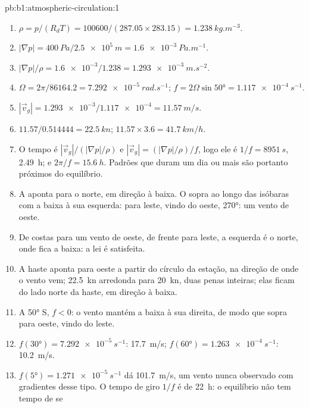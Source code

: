 \begin{solution}{pb:b1:atmospheric-circulation:1}
\begin{enumerate}
  \item $\rho = p/(R_dT) = \num{100600}/(287.05 \times 283.15) =
        \qty{1.238}{kg.m^{-3}}$.
  \item $|\nabla p| = \qty{400}{Pa}/\qty{2.5e5}{m} = \qty{1.6e-3}{Pa.m^{-1}}$.
  \item $|\nabla p|/\rho = \num{1.6e-3}/1.238 = \qty{1.293e-3}{m.s^{-2}}$.
  \item $\Omega = 2\pi/\num{86164.2} = \qty{7.292e-5}{rad.s^{-1}}$;
        $f = 2\Omega\sin\ang{50} = \qty{1.117e-4}{s^{-1}}$.
  \item $|\vec v_g| = \num{1.293e-3}/\num{1.117e-4} = \qty{11.57}{m/s}$.
  \item $11.57/0.514444 = \qty{22.5}{kn}$; $11.57 \times 3.6 = \qty{41.7}{km/h}$.
  \item O tempo é $|\vec v_g|/(|\nabla p|/\rho)$ e $|\vec v_g| = (|\nabla
        p|/\rho)/f$, logo ele é $1/f = \qty{8951}{s}$, \qty{2.49}{h}; e $2\pi/f =
        \qty{15.6}{h}$. Padrões que duram um dia ou mais são portanto próximos do equilíbrio.
  \item A  aponta para o norte, em direção à baixa. O 
        sopra ao longo das isóbaras com a baixa à sua esquerda: para leste, vindo do oeste, 
        \ang{270}: um vento de oeste.
  \item De costas para um vento de oeste, de frente para leste, a esquerda é o norte, onde fica a
        baixa: a lei é satisfeita.
  \item A haste aponta para oeste a partir do círculo da estação, na direção de onde o vento vem;
        \qty{22.5}{kn} arredonda para \qty{20}{kn}, duas penas inteiras; elas ficam do lado norte da
        haste, em direção à baixa.
  \item A \ang{50} S, $f < 0$: o vento mantém a baixa à sua direita, de modo que sopra para oeste,
        vindo do leste.
  \item $f(\ang{30}) = \qty{7.292e-5}{s^{-1}}$: \qty{17.7}{m/s}; $f(\ang{60}) =
        \qty{1.263e-4}{s^{-1}}$: \qty{10.2}{m/s}.
  \item $f(\ang{5}) = \qty{1.271e-5}{s^{-1}}$ dá \qty{101.7}{m/s}, um vento nunca observado com
        gradientes desse tipo. O tempo de giro $1/f$ é de \qty{22}{h}: o equilíbrio não tem tempo de se

\end{enumerate}
\end{solution}
